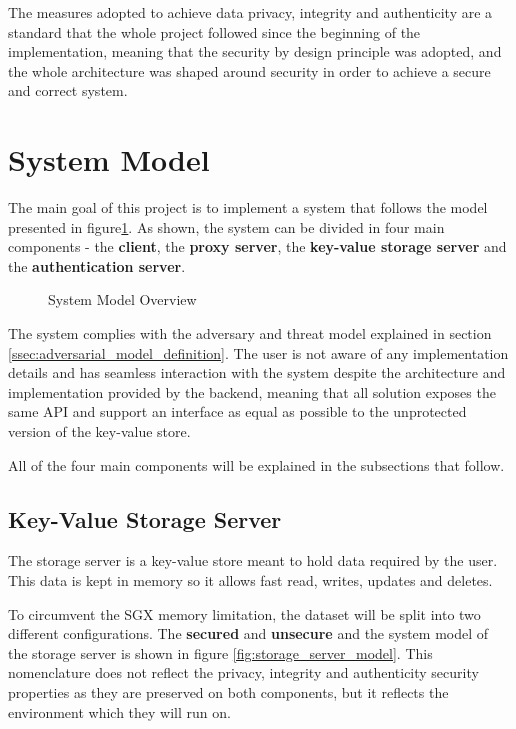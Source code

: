 The measures adopted to achieve data privacy, integrity and authenticity are a standard that the whole project followed since the beginning of the implementation, meaning that the security by design principle was adopted, and the whole architecture was shaped around security in order to achieve a secure and correct system. 

\section{System Model} %
\label{sec:system_model}

The main goal of this project is to implement a system that follows the model presented in figure\ref{fig:system_model_overview}. As shown, the system can be divided in four main components - the \textbf{client}, the \textbf{proxy server}, the \textbf{key-value storage server} and the \textbf{authentication server}.

\begin{figure}[htbp]
  \caption{System Model Overview}
  \label{fig:system_model_overview}
\end{figure}

The system complies with the adversary and threat model explained in section \ref{ssec:adversarial_model_definition}. The user is not aware of any implementation details and has seamless interaction with the system despite the architecture and implementation provided by the backend, meaning that all solution exposes the same \gls{API} and support an interface as equal as possible to the unprotected version of the key-value store. 

All of the four main components will be explained in the subsections that follow.

\subsection{Key-Value Storage Server}
\label{ssec:key-value_storage_server}

The storage server is a key-value store meant to hold data required by the user. This data is kept in memory so it allows fast read, writes, updates and deletes.

To circumvent the \gls{SGX} memory limitation, the dataset will be split into two different configurations. The \textbf{secured} and \textbf{unsecure} and the system model of the storage server is shown in figure \ref{fig:storage_server_model}. This nomenclature does not reflect the privacy, integrity and authenticity security properties as they are preserved on both components, but it reflects the environment which they will run on.

